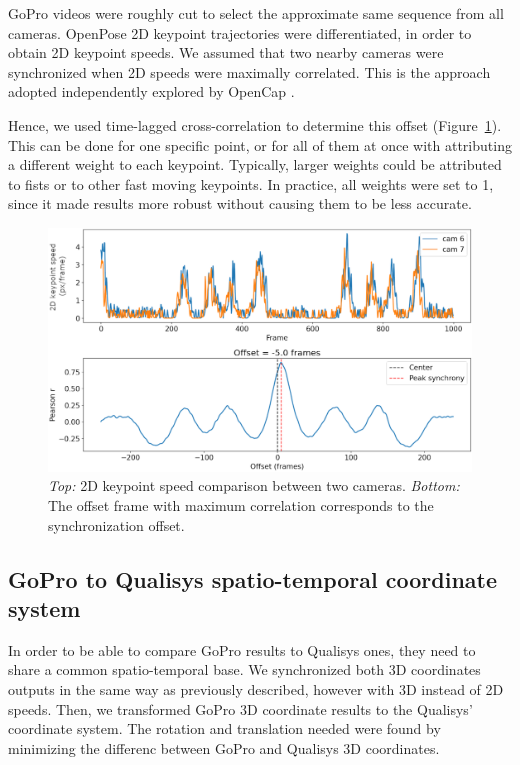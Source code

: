 GoPro videos were roughly cut to select the approximate same sequence from all cameras. OpenPose 2D keypoint trajectories were differentiated, in order to obtain 2D keypoint speeds. We assumed that two nearby cameras were synchronized when 2D speeds were maximally correlated. This is the approach adopted independently explored by OpenCap \cite{Uhlrich2022}.

Hence, we used time-lagged cross-correlation to determine this offset (Figure~\ref{fig_sync}). This can be done for one specific point, or for all of them at once with attributing a different weight to each keypoint. Typically, larger weights could be attributed to fists or to other fast moving keypoints. In practice, all weights were set to 1, since it made results more robust without causing them to be less accurate.

\begin{figure}[!ht]
	\centering
	\def\svgwidth{1\columnwidth}
	\fontsize{10pt}{10pt}\selectfont
	\includegraphics[width=\linewidth]{"../Chap6/Figures/Fig_Sync.png"}
	\caption{\textit{Top:} 2D keypoint speed comparison between two cameras. \textit{Bottom:} The offset frame with maximum correlation corresponds to the synchronization offset.}
      \label{fig_sync}
\end{figure}


\FloatBarrier
\subsection{GoPro to Qualisys spatio-temporal coordinate system}

In order to be able to compare GoPro results to Qualisys ones, they need to share a common spatio-temporal base. We synchronized both 3D coordinates outputs in the same way as previously described, however with 3D instead of 2D speeds. Then, we transformed GoPro 3D coordinate results to the Qualisys' coordinate system. The rotation and translation needed were found by minimizing the differenc between GoPro and Qualisys 3D coordinates.


